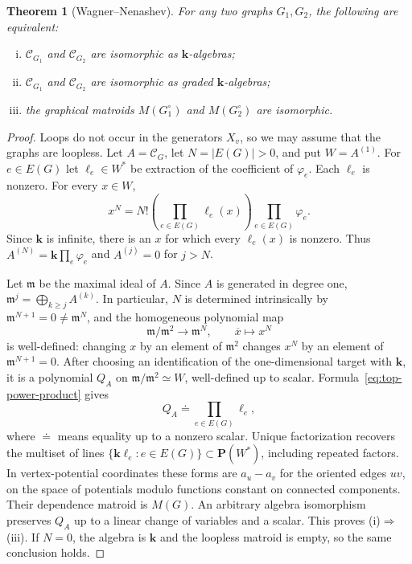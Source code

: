 \documentclass[reqno]{article}
\theoremstyle{plain} %
\newtheorem{theorem}{Theorem}[section]
\theoremstyle{definition}
\theoremstyle{remark}
\newcommand{\K} {\mathbf{k}}
\renewcommand{\P} {\mathbf{P}}
\newcommand {\CC}{\mathscr{C}}
\numberwithin{equation}{section}
\begin{document}
\begin{theorem}[Wagner--Nenashev]\label{th:wagner-nenashev}
For any two graphs $G_1,G_2$, the following are equivalent:
\begin{enumerate}[(i)]
\item $\CC_{G_1}$ and $\CC_{G_2}$ are isomorphic as $\K$-algebras;
\item $\CC_{G_1}$ and $\CC_{G_2}$ are isomorphic as graded $\K$-algebras;
\item the graphical matroids $M(G_1^\circ)$ and $M(G_2^\circ)$ are isomorphic.
\end{enumerate}
\end{theorem}

\begin{proof}
Loops do not occur in the generators $X_v$, so we may assume that the
graphs are loopless. Let $A=\CC_G$, let $N=|E(G)|>0$, and put
$W=A^{(1)}$. For $e\in E(G)$ let $\ell_e\in W^*$ be extraction of the
coefficient of $\varphi_e$. Each $\ell_e$ is nonzero. For every $x\in W$,
\begin{equation}\label{eq:top-power-product}
x^N=N!\left(\prod_{e\in E(G)}\ell_e(x)\right)
            \prod_{e\in E(G)}\varphi_e.
\end{equation}
Since $\K$ is infinite, there is an $x$ for which every $\ell_e(x)$ is
nonzero. Thus $A^{(N)}=\K\prod_e\varphi_e$ and $A^{(j)}=0$ for $j>N$.

Let $\mathfrak m$ be the maximal ideal of $A$. Since $A$ is generated
in degree one, $\mathfrak m^j=\bigoplus_{k\ge j}A^{(k)}$. In particular,
$N$ is determined intrinsically by $\mathfrak m^{N+1}=0\ne\mathfrak m^N$,
and the homogeneous polynomial map
\[
\mathfrak m/\mathfrak m^2\longrightarrow\mathfrak m^N,
\qquad \overline x\longmapsto x^N
\]
is well-defined: changing $x$ by an element of $\mathfrak m^2$ changes
$x^N$ by an element of $\mathfrak m^{N+1}=0$.
After choosing an identification of the one-dimensional target with
$\K$, it is a polynomial $Q_A$ on $\mathfrak m/\mathfrak m^2\simeq W$,
well-defined up to scalar. Formula~\eqref{eq:top-power-product} gives
\[
Q_A\doteq\prod_{e\in E(G)}\ell_e,
\]
where $\doteq$ means equality up to a nonzero scalar.
Unique factorization recovers the multiset of lines
$\{\K\ell_e:e\in E(G)\}\subset\P(W^*)$, including repeated factors.
In vertex-potential coordinates these forms are $a_u-a_v$ for the
oriented edges $uv$, on the space of potentials modulo functions constant
on connected components. Their dependence matroid is $M(G)$.
An arbitrary algebra isomorphism preserves $Q_A$ up to a linear change of
variables and a scalar. This proves (i)$\Rightarrow$(iii).
If $N=0$, the algebra is $\K$ and the loopless matroid is empty, so the
same conclusion holds.


\end{proof}
\end{document}
